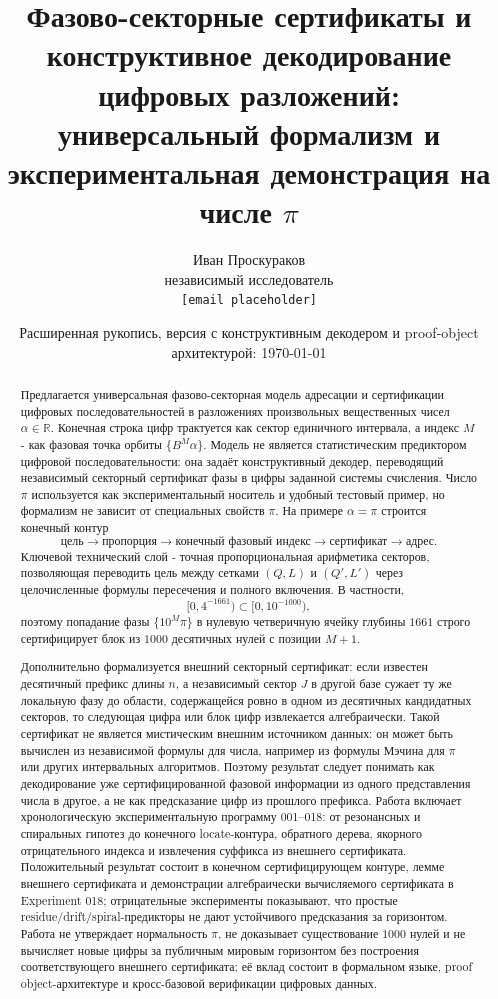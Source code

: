 \documentclass[11pt,a4paper]{article}
\title{Фазово-секторные сертификаты и конструктивное декодирование цифровых разложений:\\
универсальный формализм и экспериментальная демонстрация на числе $\pi$}
\author{Иван Проскураков\\\small независимый исследователь\\\small \texttt{[email placeholder]}}
\date{Расширенная рукопись, версия с конструктивным декодером и proof-object архитектурой: \today}
\begin{document}
\maketitle


\begin{abstract}
Предлагается универсальная фазово-секторная модель адресации и сертификации цифровых последовательностей в разложениях произвольных вещественных чисел $\alpha\in\mathbb R$.  Конечная строка цифр трактуется как сектор единичного интервала, а индекс $M$ - как фазовая точка орбиты $\{B^M\alpha\}$.  Модель не является статистическим предиктором цифровой последовательности: она задаёт конструктивный декодер, переводящий независимый секторный сертификат фазы в цифры заданной системы счисления.  Число $\pi$ используется как экспериментальный носитель и удобный тестовый пример, но формализм не зависит от специальных свойств $\pi$.  На примере $\alpha=\pi$ строится конечный контур
\[
  \text{цель}\to\text{пропорция}\to\text{конечный фазовый индекс}\to\text{сертификат}\to\text{адрес}.
\]
Ключевой технический слой - точная пропорциональная арифметика секторов, позволяющая переводить цель между сетками $(Q,L)$ и $(Q',L')$ через целочисленные формулы пересечения и полного включения.  В частности,
\[
  [0,4^{-1661})\subset[0,10^{-1000}),
\]
поэтому попадание фазы $\{10^M\pi\}$ в нулевую четверичную ячейку глубины $1661$ строго сертифицирует блок из $1000$ десятичных нулей с позиции $M+1$.

Дополнительно формализуется внешний секторный сертификат: если известен десятичный префикс длины $n$, а независимый сектор $J$ в другой базе сужает ту же локальную фазу до области, содержащейся ровно в одном из десятичных кандидатных секторов, то следующая цифра или блок цифр извлекается алгебраически.  Такой сертификат не является мистическим внешним источником данных: он может быть вычислен из независимой формулы для числа, например из формулы Мэчина для $\pi$ или других интервальных алгоритмов.  Поэтому результат следует понимать как декодирование уже сертифицированной фазовой информации из одного представления числа в другое, а не как предсказание цифр из прошлого префикса.  Работа включает хронологическую экспериментальную программу 001--018: от резонансных и спиральных гипотез до конечного locate-контура, обратного дерева, якорного отрицательного индекса и извлечения суффикса из внешнего сертификата.  Положительный результат состоит в конечном сертифицирующем контуре, лемме внешнего сертификата и демонстрации алгебраически вычисляемого сертификата в Experiment 018; отрицательные эксперименты показывают, что простые residue/drift/spiral-предикторы не дают устойчивого предсказания за горизонтом.  Работа не утверждает нормальность $\pi$, не доказывает существование $1000$ нулей и не вычисляет новые цифры за публичным мировым горизонтом без построения соответствующего внешнего сертификата; её вклад состоит в формальном языке, proof object-архитектуре и кросс-базовой верификации цифровых данных.
\end{abstract}
\end{document}

